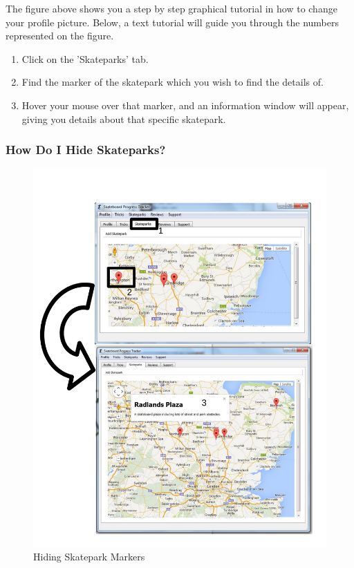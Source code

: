 The figure above shows you a step by step graphical tutorial in how to change your profile picture. Below, a text tutorial will guide you through the numbers represented on the figure.

\begin{enumerate}
\item Click on the 'Skateparks' tab.
\item Find the marker of the skatepark which you wish to find the details of.
\item Hover your mouse over that marker, and an information window will appear, giving you details about that specific skatepark.
\end{enumerate}

\subsubsection{How Do I Hide Skateparks?} 

\begin{figure}[H]
    \includegraphics[width=\textwidth]{./Manual/Images/HideSkatepark.pdf}
    \caption{Hiding Skatepark Markers} \label{fig:Hide Skatepark}
\end{figure}

